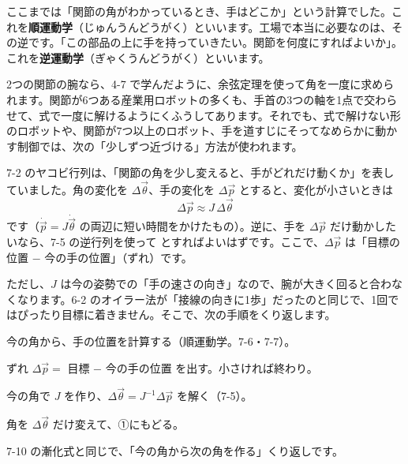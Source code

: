 \medskip
ここまでは「関節の角がわかっているとき、手はどこか」という計算でした。これを\textbf{順運動学}（じゅんうんどうがく）といいます。工場で本当に必要なのは、その逆です。「この部品の上に手を持っていきたい。関節を何度にすればよいか」。これを\textbf{逆運動学}（ぎゃくうんどうがく）といいます。


\label{bk:7-11:gyaku}2つの関節の腕なら、4-7 で学んだように、余弦定理を使って角を一度に求められます。関節が6つある産業用ロボットの多くも、手首の3つの軸を1点で交わらせて、式で一度に解けるようにくふうしてあります。それでも、式で解けない形のロボットや、関節が7つ以上のロボット、手を道すじにそってなめらかに動かす制御では、次の「少しずつ近づける」方法が使われます。

7-2 のヤコビ行列は、「関節の角を少し変えると、手がどれだけ動くか」を表していました。角の変化を $\Delta\vec\theta$、手の変化を $\Delta\vec p$ とすると、変化が小さいときは
\[ \Delta\vec p\approx J\,\Delta\vec\theta \]
です（$\dot{\vec p}=J\dot{\vec\theta}$ の両辺に短い時間をかけたもの）。逆に、手を $\Delta\vec p$ だけ動かしたいなら、7-5 の逆行列を使って
とすればよいはずです。ここで、$\Delta\vec p$ は「目標の位置 − 今の手の位置」（ずれ）です。

ただし、$J$ は今の姿勢での「手の速さの向き」なので、腕が大きく回ると合わなくなります。6-2 のオイラー法が「接線の向きに1歩」だったのと同じで、1回ではぴったり目標に着きません。そこで、次の手順をくり返します。
\begin{enumerate}[label={\bkcircled[\bkTT]{\arabic*}}, leftmargin=2.4\zw, itemsep=2pt, topsep=2pt]
\item 今の角から、手の位置を計算する（順運動学。7-6・7-7）。
\item ずれ $\Delta\vec p=$ 目標 − 今の手の位置 を出す。小さければ終わり。
\item 今の角で $J$ を作り、$\Delta\vec\theta=J^{-1}\Delta\vec p$ を解く（7-5）。
\item 角を $\Delta\vec\theta$ だけ変えて、①にもどる。
\end{enumerate}
7-10 の漸化式と同じで、「今の角から次の角を作る」くり返しです。

